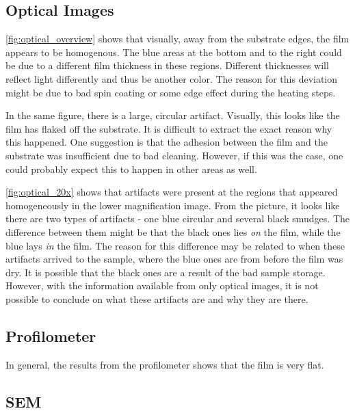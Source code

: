 
\subsection{Optical Images}

\noindent \autoref{fig:optical_overview} shows that visually, away from the substrate edges, the film appears to be homogenous.
The blue areas at the bottom and to the right could be due to a different film thickness in these regions.
Different thicknesses will reflect light differently and thus be another color.
The reason for this deviation might be due to bad spin coating or some edge effect during the heating steps.

In the same figure, there is a large, circular artifact.
Visually, this looks like the film has flaked off the substrate. 
It is difficult to extract the exact reason why this happened.
One suggestion is that the adhesion between the film and the substrate was insufficient due to bad cleaning.
However, if this was the case, one could probably expect this to happen in other areas as well.

\autoref{fig:optical_20x} shows that artifacts were present at the regions that appeared homogeneously in the lower magnification image.
From the picture, it looks like there are two types of artifacts -  one blue circular and several black smudges.
The difference between them might be that the black ones lies \textit{on} the film, while the blue lays \textit{in} the film.
The reason for this difference may be related to when these artifacts arrived to the sample, where the blue ones are from before the film was dry.
It is possible that the black ones are a result of the bad sample storage.
However, with the information available from only optical images, it is not possible to conclude on what these artifacts are and why they are there.

\subsection{Profilometer}

\noindent In general, the results from the profilometer shows that the film is very flat.




\subsection{SEM}









